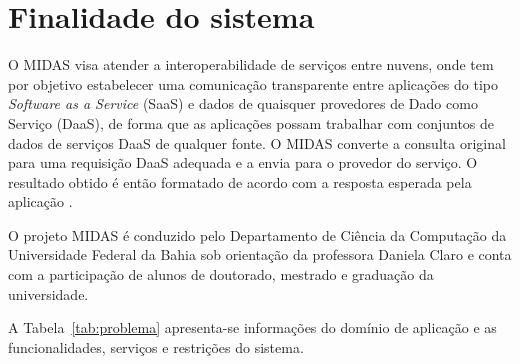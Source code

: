 \documentclass[11pt,a4paper]{article}
\begin{document}






\newpage

\section{Finalidade do sistema}

O MIDAS visa atender a interoperabilidade de serviços entre nuvens, onde tem por objetivo estabelecer uma comunicação transparente entre aplicações do tipo \textit{Software as a Service }(SaaS) e dados de quaisquer provedores de Dado como Serviço (DaaS), de forma que as aplicações possam trabalhar com conjuntos de dados de serviços DaaS de qualquer fonte. O MIDAS converte a consulta original para uma requisição DaaS adequada e a envia para o provedor do serviço. O resultado obtido é então formatado de acordo com a resposta esperada pela aplicação \cite{marinho2016midas}.

O  projeto MIDAS é conduzido pelo Departamento de Ciência da Computação da Universidade Federal da Bahia sob orientação da professora Daniela Claro e conta com a participação de alunos de doutorado, mestrado e graduação da universidade.

A Tabela~\ref{tab:problema} apresenta-se informações do domínio de aplicação e as funcionalidades, serviços e restrições do sistema.  
\end{document}
